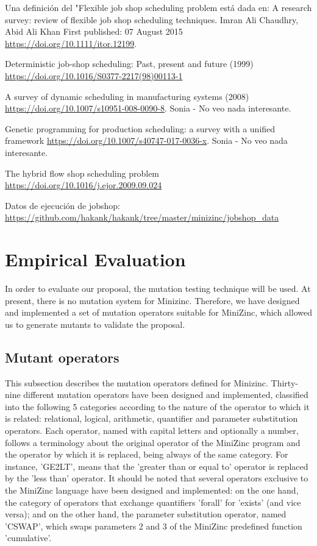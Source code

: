Una definición del "Flexible job shop scheduling problem está dada en:
A research survey: review of flexible job shop scheduling techniques.
Imran Ali Chaudhry, Abid Ali Khan
First published: 07 August 2015 
\url{https://doi.org/10.1111/itor.12199}.



Deterministic job-shop scheduling: Past, present and future (1999)
\url{https://doi.org/10.1016/S0377-2217(98)00113-1}

A survey of dynamic scheduling in manufacturing systems (2008)
\url{https://doi.org/10.1007/s10951-008-0090-8}. Sonia - No veo nada interesante.

Genetic programming for production scheduling: a survey with a unified framework
\url{https://doi.org/10.1007/s40747-017-0036-x}. Sonia - No veo nada interesante.


The hybrid flow shop scheduling problem
\url{https://doi.org/10.1016/j.ejor.2009.09.024}


Datos de ejecución de jobshop:
\url{https://github.com/hakank/hakank/tree/master/minizinc/jobshop_data}



\section{Empirical Evaluation}
\label{sec:Empirical Evaluation}
In order to evaluate our proposal, the mutation testing technique will be used. At present,
there is no mutation system for Minizinc. Therefore, we have designed and implemented a 
set of mutation operators suitable for MiniZinc, which allowed us to generate mutants to validate the proposal.

\subsection{Mutant operators}
This subsection describes the mutation operators defined for Minizinc. Thirty-nine different mutation operators have been designed and implemented, classified into the following 5 categories according to the nature of the operator to which it is related: relational, logical, arithmetic, quantifier and parameter substitution operators. Each operator, named with capital letters and optionally a number, follows a terminology about the original operator of the MiniZinc program and the operator by which it is replaced, being always of the same category. For instance, 'GE2LT', means that the 'greater than or equal to' operator is replaced by the 'less than' operator. It should be noted that several operators exclusive to the MiniZinc language have been designed and implemented: on the one hand, the category of operators that exchange quantifiers 'forall' for 'exists' (and vice versa); and on the other hand, the parameter substitution operator, named 'CSWAP', which swaps parameters 2 and 3 of the MiniZinc predefined function 'cumulative'.

